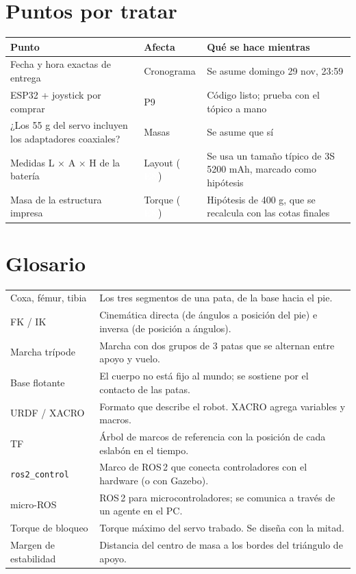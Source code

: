 \documentclass[11pt,a4paper]{article}
\newcommand{\pill}[2]{{\setlength{\fboxsep}{1.6pt}\colorbox{#1}{\textcolor{white}{\footnotesize\bfseries\,#2\,}}}}
\newcommand{\Eo}{\pill{cEstudio}{E8}}
\begin{document}
\section{Puntos por tratar}

\begin{tabularx}{\linewidth}{@{}Y l Y@{}}
\toprule \textbf{Punto} & \textbf{Afecta} & \textbf{Qué se hace mientras}\\ \midrule
Fecha y hora exactas de entrega & Cronograma & Se asume domingo 29 nov, 23:59\\
ESP32 + joystick por comprar & P9 & Código listo; prueba con el tópico a mano\\
¿Los 55 g del servo incluyen los adaptadores coaxiales? & Masas & Se asume que sí\\
Medidas L × A × H de la batería & Layout (\Eo) & Se usa un tamaño típico de 3S 5200 mAh, marcado como hipótesis\\
Masa de la estructura impresa & Torque (\Eo) & Hipótesis de 400 g, que se recalcula con las cotas finales\\
\bottomrule
\end{tabularx}

\section{Glosario}

\begin{tabularx}{\linewidth}{@{}l Y@{}}
\toprule
Coxa, fémur, tibia & Los tres segmentos de una pata, de la base hacia el pie.\\
FK / IK & Cinemática directa (de ángulos a posición del pie) e inversa (de posición a ángulos).\\
Marcha trípode & Marcha con dos grupos de 3 patas que se alternan entre apoyo y vuelo.\\
Base flotante & El cuerpo no está fijo al mundo; se sostiene por el contacto de las patas.\\
URDF / XACRO & Formato que describe el robot. XACRO agrega variables y macros.\\
TF & Árbol de marcos de referencia con la posición de cada eslabón en el tiempo.\\
\texttt{ros2\_control} & Marco de ROS\,2 que conecta controladores con el hardware (o con Gazebo).\\
micro-ROS & ROS\,2 para microcontroladores; se comunica a través de un agente en el PC.\\
Torque de bloqueo & Torque máximo del servo trabado. Se diseña con la mitad.\\
Margen de estabilidad & Distancia del centro de masa a los bordes del triángulo de apoyo.\\
\bottomrule
\end{tabularx}
\end{document}
